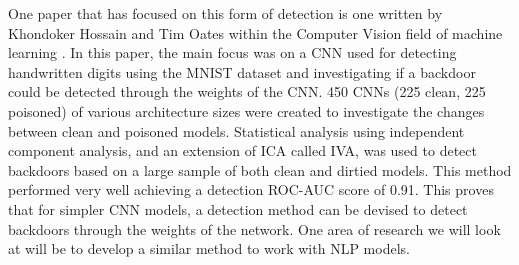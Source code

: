 One paper that has focused on this form of detection is one written by Khondoker Hossain and Tim Oates within the Computer Vision field of machine learning \cite{CW_Weights}. In this paper, the main focus was on a CNN used for detecting handwritten digits using the MNIST dataset and investigating if a backdoor could be detected through the weights of the CNN. 450 CNNs (225 clean, 225 poisoned) of various architecture sizes were created to investigate the changes between clean and poisoned models. Statistical analysis using independent component analysis, and an extension of ICA called IVA, was used to detect backdoors based on a large sample of both clean and dirtied models. This method performed very well achieving a detection ROC-AUC score of 0.91. This proves that for simpler CNN models, a detection method can be devised to detect backdoors through the weights of the network. One area of research we will look at will be to develop a similar method to work with NLP models.

